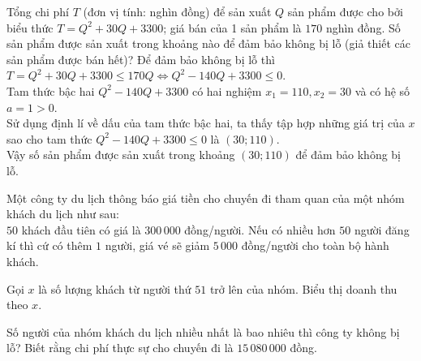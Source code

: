 \begin{bt}
	Tổng chi phí $T$ (đơn vị tính: nghìn đồng) để sản xuất $Q$ sản phẩm được cho bởi biểu thức $T=Q^2+30Q+3300$; giá bán của 1 sản phẩm là $170$ nghìn đồng. Số sản phẩm được sản xuất trong khoảng nào để đảm bảo không bị lỗ (giả thiết các sản phẩm được bán hết)?
	\loigiai
	{
		Để đảm bảo không bị lỗ thì $T=Q^2+30Q+3300 \le 170Q \Leftrightarrow Q^2-140Q+3300\le 0$.\\
		Tam thức bậc hai $Q^2-140Q+3300$ có hai nghiệm $x_1=110, x_2=30$ và có hệ số $a=1>0$.\\
		Sử dụng định lí về dấu của tam thức bậc hai, ta thấy tập hợp những giá trị của $x$ sao cho tam thức $Q^2-140Q+3300\le 0$ là $\left(30;110\right)$.\\
		Vậy số sản phẩm được sản xuất trong khoảng $\left(30;110\right)$ để đảm bảo không bị lỗ.
	}
\end{bt}
\begin{bt}%
	Một công ty du lịch thông báo giá tiền cho chuyến đi tham quan của một nhóm khách du lịch như sau:\\
	$50$ khách đầu tiên có giá là $300\,000$ đồng/người. Nếu có nhiều hơn $50$ người đăng kí thì cứ có thêm $1$ người, giá vé sẽ giảm $5\,000$ đồng/người cho toàn bộ hành khách.
	\begin{enumEX}[a)]{1}
		\item Gọi $x$ là số lượng khách từ người thứ $51$ trở lên của nhóm. Biểu thị doanh thu theo $x$.
		\item Số người của nhóm khách du lịch nhiều nhất là bao nhiêu thì công ty không bị lỗ? Biết rằng chi phí thực sự cho chuyến đi là $15\,080\,000$ đồng.
	\end{enumEX}
\end{bt}
